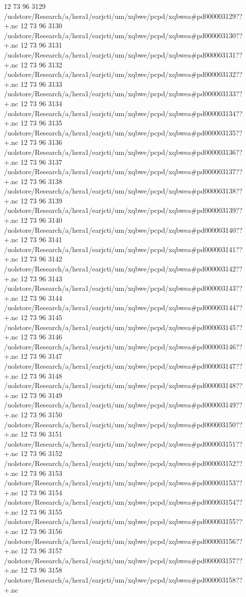 12 73 96
3129
/uolstore/Research/a/hera1/earjcti/um/xqbwe/pcpd/xqbwea#pd000003129??+.nc
12 73 96
3130
/uolstore/Research/a/hera1/earjcti/um/xqbwe/pcpd/xqbwea#pd000003130??+.nc
12 73 96
3131
/uolstore/Research/a/hera1/earjcti/um/xqbwe/pcpd/xqbwea#pd000003131??+.nc
12 73 96
3132
/uolstore/Research/a/hera1/earjcti/um/xqbwe/pcpd/xqbwea#pd000003132??+.nc
12 73 96
3133
/uolstore/Research/a/hera1/earjcti/um/xqbwe/pcpd/xqbwea#pd000003133??+.nc
12 73 96
3134
/uolstore/Research/a/hera1/earjcti/um/xqbwe/pcpd/xqbwea#pd000003134??+.nc
12 73 96
3135
/uolstore/Research/a/hera1/earjcti/um/xqbwe/pcpd/xqbwea#pd000003135??+.nc
12 73 96
3136
/uolstore/Research/a/hera1/earjcti/um/xqbwe/pcpd/xqbwea#pd000003136??+.nc
12 73 96
3137
/uolstore/Research/a/hera1/earjcti/um/xqbwe/pcpd/xqbwea#pd000003137??+.nc
12 73 96
3138
/uolstore/Research/a/hera1/earjcti/um/xqbwe/pcpd/xqbwea#pd000003138??+.nc
12 73 96
3139
/uolstore/Research/a/hera1/earjcti/um/xqbwe/pcpd/xqbwea#pd000003139??+.nc
12 73 96
3140
/uolstore/Research/a/hera1/earjcti/um/xqbwe/pcpd/xqbwea#pd000003140??+.nc
12 73 96
3141
/uolstore/Research/a/hera1/earjcti/um/xqbwe/pcpd/xqbwea#pd000003141??+.nc
12 73 96
3142
/uolstore/Research/a/hera1/earjcti/um/xqbwe/pcpd/xqbwea#pd000003142??+.nc
12 73 96
3143
/uolstore/Research/a/hera1/earjcti/um/xqbwe/pcpd/xqbwea#pd000003143??+.nc
12 73 96
3144
/uolstore/Research/a/hera1/earjcti/um/xqbwe/pcpd/xqbwea#pd000003144??+.nc
12 73 96
3145
/uolstore/Research/a/hera1/earjcti/um/xqbwe/pcpd/xqbwea#pd000003145??+.nc
12 73 96
3146
/uolstore/Research/a/hera1/earjcti/um/xqbwe/pcpd/xqbwea#pd000003146??+.nc
12 73 96
3147
/uolstore/Research/a/hera1/earjcti/um/xqbwe/pcpd/xqbwea#pd000003147??+.nc
12 73 96
3148
/uolstore/Research/a/hera1/earjcti/um/xqbwe/pcpd/xqbwea#pd000003148??+.nc
12 73 96
3149
/uolstore/Research/a/hera1/earjcti/um/xqbwe/pcpd/xqbwea#pd000003149??+.nc
12 73 96
3150
/uolstore/Research/a/hera1/earjcti/um/xqbwe/pcpd/xqbwea#pd000003150??+.nc
12 73 96
3151
/uolstore/Research/a/hera1/earjcti/um/xqbwe/pcpd/xqbwea#pd000003151??+.nc
12 73 96
3152
/uolstore/Research/a/hera1/earjcti/um/xqbwe/pcpd/xqbwea#pd000003152??+.nc
12 73 96
3153
/uolstore/Research/a/hera1/earjcti/um/xqbwe/pcpd/xqbwea#pd000003153??+.nc
12 73 96
3154
/uolstore/Research/a/hera1/earjcti/um/xqbwe/pcpd/xqbwea#pd000003154??+.nc
12 73 96
3155
/uolstore/Research/a/hera1/earjcti/um/xqbwe/pcpd/xqbwea#pd000003155??+.nc
12 73 96
3156
/uolstore/Research/a/hera1/earjcti/um/xqbwe/pcpd/xqbwea#pd000003156??+.nc
12 73 96
3157
/uolstore/Research/a/hera1/earjcti/um/xqbwe/pcpd/xqbwea#pd000003157??+.nc
12 73 96
3158
/uolstore/Research/a/hera1/earjcti/um/xqbwe/pcpd/xqbwea#pd000003158??+.nc
